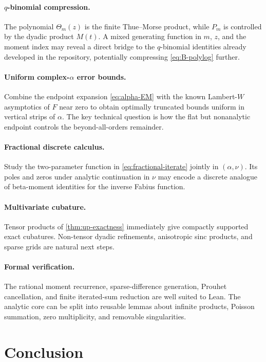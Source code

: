 \documentclass[11pt]{article}
\theoremstyle{definition}
\theoremstyle{remark}
\begin{document}
\paragraph{$q$-binomial compression.}
The polynomial $\Theta_m(z)$ is the finite Thue--Morse product, while
$P_m$ is controlled by the dyadic product $M(t)$.  A mixed generating function
in $m$, $z$, and the moment index may reveal a direct bridge to the
$q$-binomial identities already developed in the repository, potentially
compressing \eqref{eq:B-polylog} further.

\paragraph{Uniform complex-$\alpha$ error bounds.}
Combine the endpoint expansion \eqref{eq:alpha-EM} with the known
Lambert-$W$ asymptotics of $F$ near zero to obtain optimally truncated bounds
uniform in vertical strips of $\alpha$.  The key technical question is how the
flat but nonanalytic endpoint controls the beyond-all-orders remainder.

\paragraph{Fractional discrete calculus.}
Study the two-parameter function in \eqref{eq:fractional-iterate} jointly in
$(\alpha,\nu)$.  Its poles and zeros under analytic continuation in $\nu$ may
encode a discrete analogue of beta-moment identities for the inverse Fabius
function.

\paragraph{Multivariate cubature.}
Tensor products of \cref{thm:up-exactness} immediately give compactly
supported exact cubatures.  Non-tensor dyadic refinements, anisotropic sinc
products, and sparse grids are natural next steps.

\paragraph{Formal verification.}
The rational moment recurrence, sparse-difference generation, Prouhet
cancellation, and finite iterated-sum reduction are well suited to Lean.  The
analytic core can be split into reusable lemmas about infinite products,
Poisson summation, zero multiplicity, and removable singularities.

\section{Conclusion}
\end{document}
